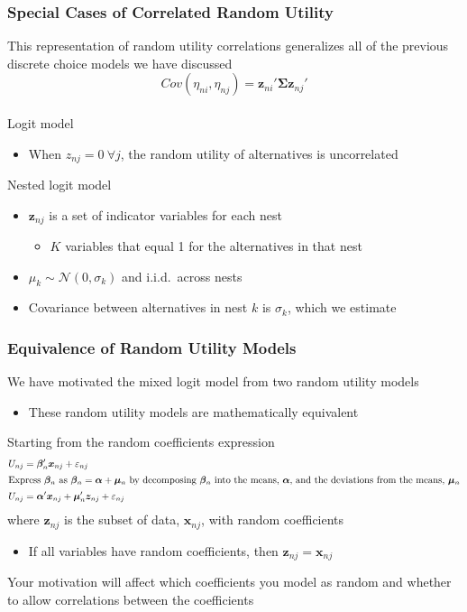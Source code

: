 \documentclass{beamer}\usepackage[]{graphicx}\usepackage[]{color}
\begin{document}
\begin{frame}\frametitle{Special Cases of Correlated Random Utility}
    This representation of random utility correlations generalizes all of the previous discrete choice models we have discussed
    $$Cov(\eta_{ni}, \eta_{nj}) = \bm{z}_{ni}' \bm{\Sigma} \bm{z}_{nj}'$$ \\
    \vspace{2ex}
    Logit model
    \begin{itemize}
    	\item When $z_{nj} = 0 ~\forall j$, the random utility of alternatives is uncorrelated
    \end{itemize}
    \vspace{2ex}
    Nested logit model
    \begin{itemize}
    	\item $\bm{z}_{nj}$ is a set of indicator variables for each nest
    	\begin{itemize}
    		\item $K$ variables that equal 1 for the alternatives in that nest
    	\end{itemize}
    	\item $\mu_k \sim \mathcal{N}(0, \sigma_k)$ and i.i.d.\ across nests
    	\item Covariance between alternatives in nest $k$ is $\sigma_k$, which we estimate
    \end{itemize}
\end{frame}

\begin{frame}\frametitle{Equivalence of Random Utility Models}
    We have motivated the mixed logit model from two random utility models
    \begin{itemize}
    	\item These random utility models are mathematically equivalent
    \end{itemize}
    \vspace{2ex}
    Starting from the random coefficients expression
    \begin{align*}
        U_{nj} & = \bm{\beta}_n' \bm{x}_{nj} + \varepsilon_{nj} \\
        \intertext{Express $\bm{\beta}_n$ as $\bm{\beta}_n = \bm{\alpha} + \bm{\mu}_n$ by decomposing $\bm{\beta}_n$ into the means, $\bm{\alpha}$, and the deviations from the means, $\bm{\mu}_n$}
        U_{nj} & = \bm{\alpha}' \bm{x}_{nj} + \bm{\mu}_n' \bm{z}_{nj} + \varepsilon_{nj}
    \end{align*}
    where $\bm{z}_{nj}$ is the subset of data, $\bm{x}_{nj}$, with random coefficients
    \begin{itemize}
    	\item If all variables have random coefficients, then $\bm{z}_{nj} = \bm{x}_{nj}$
    \end{itemize}
    \vspace{2ex}
    Your motivation will affect which coefficients you model as random and whether to allow correlations between the coefficients
\end{frame}
\end{document}
